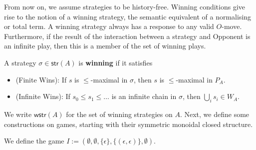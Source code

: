 \documentclass[runningheads,a4paper]{llncs}
\newcommand{\str}{\mathsf{str}}
\newcommand{\wstr}{\mathsf{wstr}}
\renewcommand{\emph}[1]{\textbf{#1}}
\begin{document}
From now on, we assume strategies to be history-free. Winning conditions give rise to the notion of a winning strategy, the semantic equivalent of a normalising or total term. A winning strategy always has a response to any valid $O$-move. Furthermore, if the result of the interaction between a strategy and Opponent is an infinite play, then this is a member of the set of winning plays.
\begin{definition}A strategy $\sigma\in\str(A)$ is \emph{winning} if it satisfies
\begin{itemize}
\item[] (Finite Wins): If $s$ is $\leq$-maximal in $\sigma$, then $s$ is $\leq$-maximal in $P_A$.
\item[] (Infinite Wins): If $s_0\leq s_1\leq \ldots$ is an infinite chain in $\sigma$, then $\bigcup_i s_i\in W_A$.
\end{itemize}
\end{definition}
We write $\wstr(A)$ for the set of winning strategies on $A$.
Next, we define some constructions on games, starting with their symmetric monoidal closed structure.
\begin{definition} We define the game $I:=(\emptyset,\emptyset,\{\epsilon\},\{(\epsilon,\epsilon)\},\emptyset)$.\end{definition}
\end{document}
